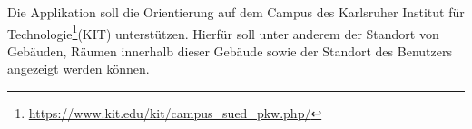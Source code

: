 Die Applikation soll die Orientierung auf dem \Gls{Campus} des Karlsruher Institut für Technologie\footnote{\href{https://www.kit.edu/kit/campus_sued_pkw.php/}{https://www.kit.edu/kit/campus\_sued\_pkw.php/}}(\Gls{KIT})
 unterstützen. Hierfür soll unter anderem der Standort von Gebäuden, Räumen innerhalb dieser Gebäude sowie der Standort
 des \Gls{Benutzer}s angezeigt werden können.